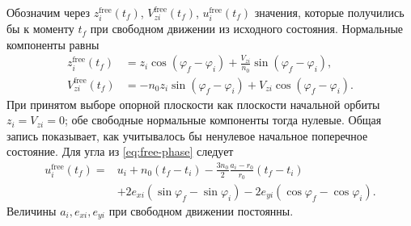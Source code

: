 \documentclass[a4paper,11pt]{article}
\numberwithin{equation}{section}
\theoremstyle{remark}
\begin{document}
Обозначим через $z_i^{\mathrm{free}}(t_f)$,
$V_{zi}^{\mathrm{free}}(t_f)$, $u_i^{\mathrm{free}}(t_f)$ значения,
которые получились бы к моменту $t_f$ при свободном движении из
исходного состояния. Нормальные компоненты равны
\[
 \begin{aligned}
 z_i^{\mathrm{free}}(t_f)
 &=z_i\cos(\varphi_f-\varphi_i)
       +\frac{V_{zi}}{n_0}\sin(\varphi_f-\varphi_i),\\
 V_{zi}^{\mathrm{free}}(t_f)
 &=-n_0z_i\sin(\varphi_f-\varphi_i)
       +V_{zi}\cos(\varphi_f-\varphi_i).
 \end{aligned}
\]
При принятом выборе опорной плоскости как плоскости начальной
орбиты $z_i=V_{zi}=0$; обе свободные нормальные компоненты тогда
нулевые. Общая запись показывает, как учитывалось бы ненулевое
начальное поперечное состояние.
Для угла из \eqref{eq:free-phase} следует
\begin{equation}
 \begin{aligned}
 u_i^{\mathrm{free}}(t_f)={}&u_i+n_0(t_f-t_i)
       -\frac{3n_0}{2}\frac{a_i-r_0}{r_0}(t_f-t_i)\\
 &+2e_{xi}(\sin\varphi_f-\sin\varphi_i)
       -2e_{yi}(\cos\varphi_f-\cos\varphi_i).
 \end{aligned}
 \label{eq:free-terminal-phase}
\end{equation}
Величины $a_i,e_{xi},e_{yi}$ при свободном движении постоянны.
\end{document}
